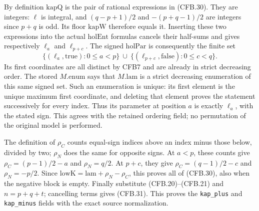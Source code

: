 By definition \(\mathrm{kapQ}\) is the pair of rational
expressions in (CFB.30).  They are integers: \(\ell\) is
integral, and \((q-p+1)/2\) and \(-(p+q-1)/2\) are integers
since \(p+q\) is odd.  Its floor \(\mathrm{kapW}\) therefore
equals it.  Inserting these two expressions into the actual
\(\mathrm{holEnt}\) formulas cancels their half-sums and gives
respectively \(\ell_a\) and \(\ell_{p+c}\).
The signed \(\mathrm{holPar}\) is consequently the finite set
\[
       \{(\ell_a,\mathrm{true}):0\le a<p\}
       \ \cup\ 
       \{(\ell_{p+c},\mathrm{false}):0\le c<q\}.              \tag{CFB.32}
\]
Its first coordinates are all distinct by CFB7 and are already in
strict decreasing order.  The stored \(M.\mathrm{enum}\) says
that \(M.\mathrm{lam}\) is a strict decreasing enumeration of
this same signed set.  Such an enumeration is unique: its first
element is the unique maximum first coordinate, and deleting that
element proves the statement successively for every index.
Thus its parameter at position \(a\) is exactly \(\ell_a\),
with the stated sign.  This agrees with the retained ordering field;
no permutation of the original model is performed.

The definition of \(\rho_C\) counts equal-sign indices above an
index minus those below, divided by two; \(\rho_N\) does the
same for opposite signs.  At \(a<p\), these counts give
\(\rho_C=(p-1)/2-a\) and \(\rho_N=q/2\).
At \(p+c\), they give \(\rho_C=(q-1)/2-c\) and
\(\rho_N=-p/2\).
Since \(\mathrm{lowK}=\mathrm{lam}+\rho_N-\rho_C\), this proves
all of (CFB.30), also when the negative block is empty.
Finally substitute (CFB.20)--(CFB.21) and
\(n=p+q+t\); cancelling terms gives (CFB.31).
This proves the \texttt{kap\_plus} and \texttt{kap\_minus}
fields with the exact source normalization.

